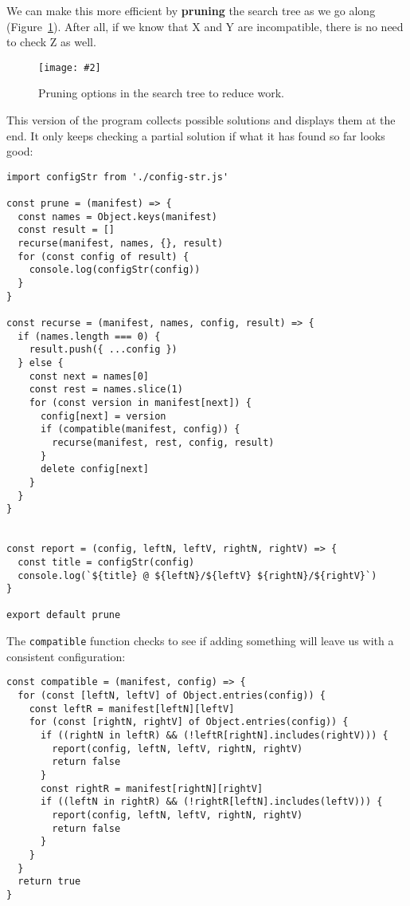 \documentclass[krantzl]{krantz}
\newcommand{\figpdf}[4]{\begin{figure}%
\centering%
\texttt{[image: \#2]}%
\caption{#3}%
\label{#1}%
\end{figure}}
\newcommand{\figref}[1]{Figure~\ref{#1}}
\newcommand{\glossref}[1]{\textbf{#1}}
\begin{document}
We can make this more efficient by \glossref{pruning} the search tree
as we go along
(\figref{package-manager-pruning}).
After all,
if we know that X and Y are incompatible,
there is no need to check Z as well.

\figpdf{package-manager-pruning}{./package-manager/pruning.pdf}{Pruning options in the search tree to reduce work.}{0.6}


This version of the program collects possible solutions and displays them at the end.
It only keeps checking a partial solution if what it has found so far looks good:


\begin{lstlisting}[frame=tblr]
import configStr from './config-str.js'

const prune = (manifest) => {
  const names = Object.keys(manifest)
  const result = []
  recurse(manifest, names, {}, result)
  for (const config of result) {
    console.log(configStr(config))
  }
}

const recurse = (manifest, names, config, result) => {
  if (names.length === 0) {
    result.push({ ...config })
  } else {
    const next = names[0]
    const rest = names.slice(1)
    for (const version in manifest[next]) {
      config[next] = version
      if (compatible(manifest, config)) {
        recurse(manifest, rest, config, result)
      }
      delete config[next]
    }
  }
}


const report = (config, leftN, leftV, rightN, rightV) => {
  const title = configStr(config)
  console.log(`${title} @ ${leftN}/${leftV} ${rightN}/${rightV}`)
}

export default prune
\end{lstlisting}



The \texttt{compatible} function checks to see if adding something will leave us with a consistent configuration:


\begin{lstlisting}[frame=tblr]
const compatible = (manifest, config) => {
  for (const [leftN, leftV] of Object.entries(config)) {
    const leftR = manifest[leftN][leftV]
    for (const [rightN, rightV] of Object.entries(config)) {
      if ((rightN in leftR) && (!leftR[rightN].includes(rightV))) {
        report(config, leftN, leftV, rightN, rightV)
        return false
      }
      const rightR = manifest[rightN][rightV]
      if ((leftN in rightR) && (!rightR[leftN].includes(leftV))) {
        report(config, leftN, leftV, rightN, rightV)
        return false
      }
    }
  }
  return true
}
\end{lstlisting}
\end{document}
